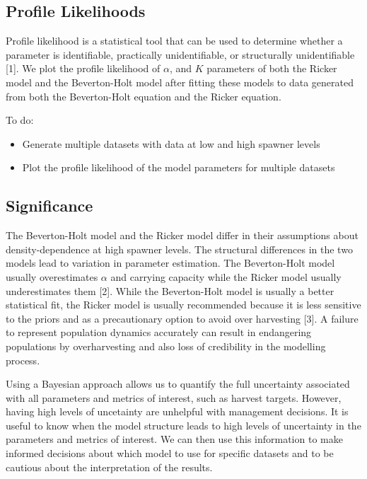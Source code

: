 \documentclass[10pt,letterpaper]{article}
\providecommand{\tightlist}{%
  \setlength{\itemsep}{0pt}\setlength{\parskip}{0pt}}
\begin{document}
\subsection{Profile Likelihoods}\label{profile-likelihoods}

Profile likelihood is a statistical tool that can be used to determine
whether a parameter is identifiable, practically unidentifiable, or
structurally unidentifiable {[}1{]}. We plot the profile likelihood of
\(\alpha\), and \(K\) parameters of both the Ricker model and the
Beverton-Holt model after fitting these models to data generated from
both the Beverton-Holt equation and the Ricker equation.

To do:

\begin{itemize}
\tightlist
\item
  Generate multiple datasets with data at low and high spawner levels
\item
  Plot the profile likelihood of the model parameters for multiple
  datasets
\end{itemize}

\subsection{Significance}\label{significance}

The Beverton-Holt model and the Ricker model differ in their assumptions
about density-dependence at high spawner levels. The structural
differences in the two models lead to variation in parameter estimation.
The Beverton-Holt model usually overestimates \(\alpha\) and carrying
capacity while the Ricker model usually underestimates them {[}2{]}.
While the Beverton-Holt model is usually a better statistical fit, the
Ricker model is usually recommended because it is less sensitive to the
priors and as a precautionary option to avoid over harvesting {[}3{]}. A
failure to represent population dynamics accurately can result in
endangering populations by overharvesting and also loss of credibility
in the modelling process.

Using a Bayesian approach allows us to quantify the full uncertainty
associated with all parameters and metrics of interest, such as harvest
targets. However, having high levels of uncetainty are unhelpful with
management decisions. It is useful to know when the model structure
leads to high levels of uncertainty in the parameters and metrics of
interest. We can then use this information to make informed decisions
about which model to use for specific datasets and to be cautious about
the interpretation of the results.
\end{document}
